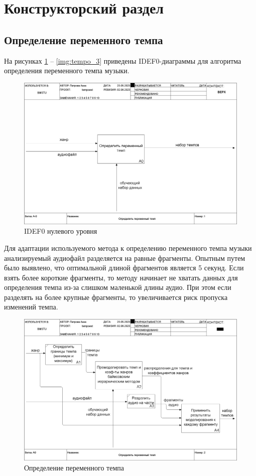 \section{Конструкторский раздел}

\subsection{Определение переменного темпа}

На рисунках \ref{img:tempo_0} -- \ref{img:tempo_3} приведены IDEF0-диаграммы для алгоритма определения переменного темпа музыки.

\begin{figure}[h]
	\centering
	\includegraphics[scale=0.25]{inc/img/tempo_idef/01_A-0.png}
	\caption{IDEF0 нулевого уровня}
	\label{img:tempo_0}
\end{figure}

Для адаптации используемого метода к определению переменного темпа музыки анализируемый аудиофайл разделяется на равные фрагменты. Опытным путем было выявлено, что оптимальной длиной фрагментов является 5 секунд. Если взять более короткие фрагменты, то методу начинает не хватать данных для определения темпа из-за слишком маленькой длины аудио. При этом если разделять на более крупные фрагменты, то увеличивается риск пропуска изменений темпа.

\begin{figure}[h]
	\centering
	\includegraphics[scale=0.25]{inc/img/tempo_idef/02_A0.png}
	\caption{Определение переменного темпа}
	\label{img:tempo_1}
\end{figure}

